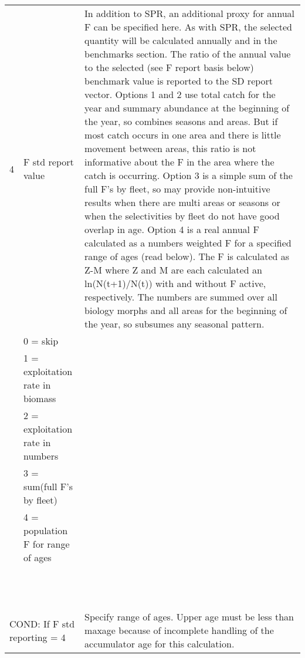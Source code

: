 \begin{landscape}
\begin{longtable}{p{3cm} p{7cm} p{11cm}}
 \hline 
 4 & F std report value &  \multirow{1}{1cm}[-0.1cm]{\parbox{11cm}{In addition to SPR, an additional proxy for annual F can be specified here.  As with SPR, the selected quantity will be calculated annually and in the benchmarks section.  The ratio of the annual value to the selected (see F report basis below) benchmark value is reported to the SD report vector.  Options 1 and 2 use total catch for the year and summary abundance at the beginning of the year, so combines seasons and areas.  But if most catch occurs in one area and there is little movement between areas, this ratio is not informative about the F in the area where the catch is occurring.  Option 3 is a simple sum of the full F’s by fleet, so may provide non-intuitive results when there are multi areas or seasons or when the selectivities by fleet do not have good overlap in age.  Option 4 is a real annual F calculated as a numbers weighted F for a specified range of ages (read below).  The F is calculated as Z-M where Z and M are each calculated an ln(N(t+1)/N(t)) with and without F active, respectively. The numbers are summed over all biology morphs and all areas for the beginning of the year, so subsumes any seasonal pattern.}}\\
   & 0 = skip & \\
   & 1 = exploitation rate in biomass & \\
   & 2 = exploitation rate in numbers & \\
   & 3 = sum(full F's by fleet) & \\
   & 4 = population F for range of ages & \\
   & & \\
   & & \\
   & & \\
   & & \\
   & & \\
   & & \\
   & & \\  
   & & \\
   & & \\
   & & \\  
   & & \\
   & & \\
  
 \multicolumn{2}{l}{COND: If F std reporting = 4 } & \multirow{1}{1cm}[-0.1cm]{\parbox{11cm}{Specify range of ages. Upper age must be less than maxage because of incomplete handling of the accumulator age for this calculation.}} \\


\end{longtable}
\end{landscape}
